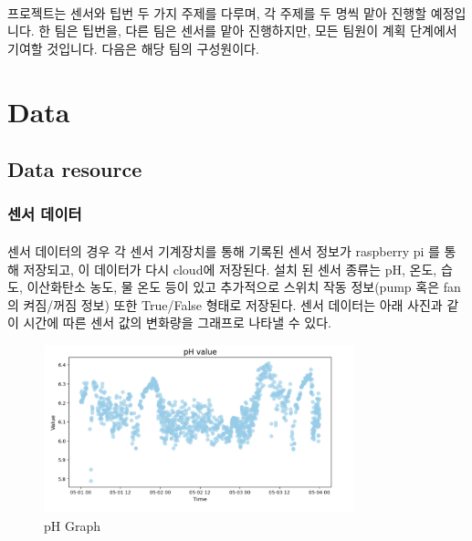 \documentclass[11pt]{article}
\begin{document}
\paragraph{} 프로젝트는 센서와 팁번 두 가지 주제를 다루며, 각 주제를 두 명씩 맡아 진행할 예정입니다. 한 팀은 팁번을, 다른 팀은 센서를 맡아 진행하지만, 모든 팀원이 계획 단계에서 기여할 것입니다. 다음은 해당 팀의 구성원이다.  

       

    \section{Data}
    \subsection{Data resource}
    \subsubsection{센서 데이터}

    \paragraph{} 센서 데이터의 경우 각 센서 기계장치를 통해 기록된 센서 정보가 raspberry pi 를 통해 저장되고, 이 데이터가 다시 cloud에 저장된다. 설치 된 센서 종류는 pH, 온도, 습도, 이산화탄소 농도, 물 온도 등이 있고 추가적으로 스위치 작동 정보(pump 혹은 fan의 켜짐/꺼짐 정보) 또한 True/False 형태로 저장된다. 센서 데이터는 아래 사진과 같이 시간에 따른 센서 값의 변화량을 그래프로 나타낼 수 있다. 

    \begin{figure}[h]
    \centering
    \includegraphics[width=0.8\textwidth]{Latex_Proposal/images/pH_graph.png} %
    \caption{pH Graph}
    \label{fig:pH_graph}
    \end{figure}
\end{document}
